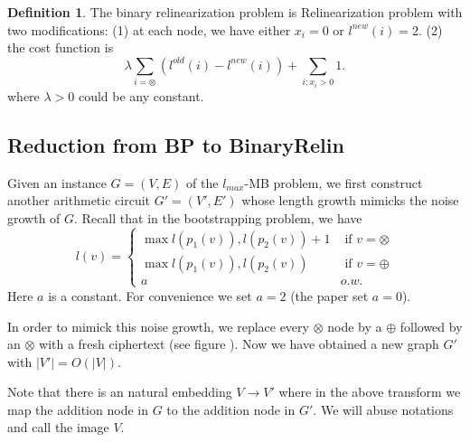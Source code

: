 \documentclass[11pt]{article} %
\theoremstyle{plain}
\theoremstyle{definition}
\newtheorem{definition}{Definition}
\begin{document}
\begin{definition}
The binary relinearization problem is Relinearization problem with two modifications: (1) at each node, we have either $x_i = 0$ or $l^{new}(i) = 2$. (2) the cost function is 
\[
	\lambda \sum_{i = \otimes } (l^{old}(i) - l^{new}(i)) + \sum_{i: x_i > 0} 1.  
\]	
where $\lambda > 0$ could be any constant. 
\end{definition}

\subsection{Reduction from BP to BinaryRelin}

Given an instance $G = (V,E)$ of the $l_{max}$-MB problem, we first construct another arithmetic circuit $G' = (V',E')$ whose length growth mimicks the noise growth of $G$. Recall that in the bootstrapping problem, 
we have 
\[
	l(v) = \begin{cases} \max{l(p_1(v)), l(p_2(v))} + 1 & \mbox{ if } v = \otimes \\ 
	\max{l(p_1(v)), l(p_2(v))} & \mbox{ if } v = \oplus \\ 
	a & o.w. 
	\end{cases}
\]
Here $a$ is a constant. For convenience we set $a = 2$ (the paper set $a = 0$). 

In order to mimick this noise growth, we replace every $\otimes$ node by 
a $\oplus$ followed by an $\otimes$ with a fresh ciphertext  (see figure ). 
Now we have obtained a new graph $G'$ with $|V'| = O(|V|)$. 





Note that there is an natural embedding $V \to V'$ where in the above transform we map the addition node in $G$ to the addition node in $G'$. 
We will abuse notations and call the image $V$. 
\end{document}
